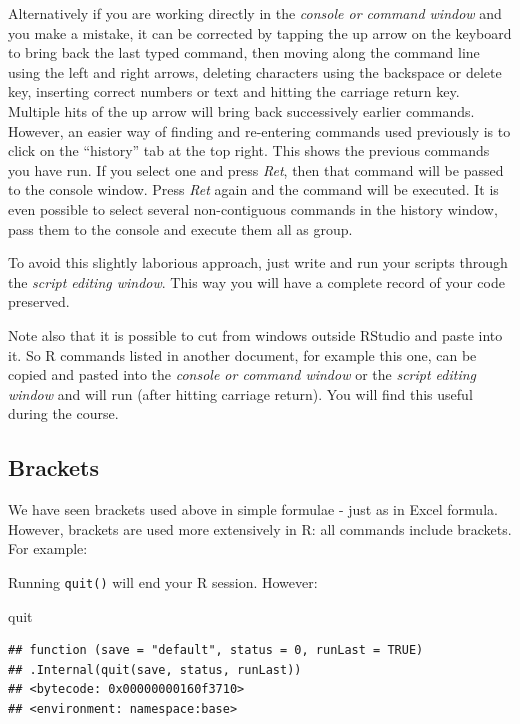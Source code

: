 \documentclass[
]{book}
\makeatletter
\newenvironment{Shaded}{\begin{snugshade}}{\end{snugshade}}
\newcommand{\NormalTok}[1]{#1}
\newenvironment{kframe}{%
\medskip{}
\setlength{\fboxsep}{.8em}
 \def\at@end@of@kframe{}%
 \ifinner\ifhmode%
  \def\at@end@of@kframe{\end{minipage}}%
  \begin{minipage}{\columnwidth}%
 \fi\fi%
 \def\FrameCommand##1{\hskip\@totalleftmargin \hskip-\fboxsep
 \colorbox{shadecolor}{##1}\hskip-\fboxsep
     \hskip-\linewidth \hskip-\@totalleftmargin \hskip\columnwidth}%
 \MakeFramed {\advance\hsize-\width
   \@totalleftmargin\z@ \linewidth\hsize
   \@setminipage}}%
 {\par\unskip\endMakeFramed%
 \at@end@of@kframe}
\newenvironment{rmdblock}[1]
  {
  \begin{itemize}
  \renewcommand{\labelitemi}{
    \raisebox{-.7\height}[0pt][0pt]{
      {\setkeys{Gin}{width=3em,keepaspectratio}\texttt{[image: images/\#1]}}
    }
  }
  \setlength{\fboxsep}{1em}
  \begin{kframe}
  \item
  }
  {
  \end{kframe}
  \end{itemize}
  }
\newenvironment{rmdnote}
  {\begin{rmdblock}{note}}
  {\end{rmdblock}}
\makeatother
\begin{document}
Alternatively if you are working directly in the \emph{console or command window} and you make a mistake, it can be corrected by tapping the up arrow on the keyboard to bring back the last typed command, then moving along the command line using the left and right arrows, deleting characters using the backspace or delete key, inserting correct numbers or text and hitting the carriage return key. Multiple hits of the up arrow will bring back successively earlier commands. However, an easier way of finding and re-entering commands used previously is to click on the ``history'' tab at the top right. This shows the previous commands you have run. If you select one and press \emph{Ret}, then that command will be passed to the console window. Press \emph{Ret} again and the command will be executed. It is even possible to select several non-contiguous commands in the history window, pass them to the console and execute them all as group.

To avoid this slightly laborious approach, just write and run your scripts through the \emph{script editing window}. This way you will have a complete record of your code preserved.

\begin{rmdnote}
Note also that it is possible to cut from windows outside RStudio and paste into it. So R commands listed in another document, for example this one, can be copied and pasted into the \emph{console or command window} or the \emph{script editing window} and will run (after hitting carriage return). You will find this useful during the course.
\end{rmdnote}

\hypertarget{brackets}{%
\subsection{Brackets}\label{brackets}}

We have seen brackets used above in simple formulae - just as in Excel formula. However, brackets are used more extensively in R: all commands include brackets. For example:

Running \texttt{quit()} will end your R session. However:

\begin{Shaded}
\begin{Highlighting}[]
\NormalTok{quit}
\end{Highlighting}
\end{Shaded}

\begin{verbatim}
## function (save = "default", status = 0, runLast = TRUE) 
## .Internal(quit(save, status, runLast))
## <bytecode: 0x00000000160f3710>
## <environment: namespace:base>
\end{verbatim}
\end{document}
